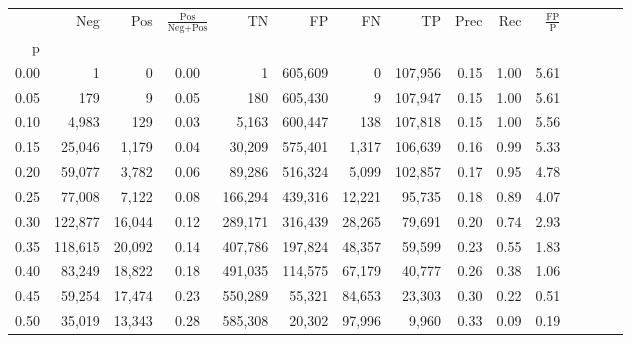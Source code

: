 \begin{tabular}{rrrcrrrrrrrrrrr}
\toprule
{} &      Neg &     Pos & $\frac{\text{Pos}}{\text{Neg}+\text{Pos}}$ &       TN &       FP &       FN &       TP &  Prec &   Rec & $\frac{\text{FP}}{\text{P}}$ \\
p    &          &         &                                            &          &          &          &          &       &       &                              \\
\midrule
0.00 &        1 &       0 &                                       0.00 &        1 &  605,609 &        0 &  107,956 &  0.15 &  1.00 &                         5.61 \\
0.05 &      179 &       9 &                                       0.05 &      180 &  605,430 &        9 &  107,947 &  0.15 &  1.00 &                         5.61 \\
0.10 &    4,983 &     129 &                                       0.03 &    5,163 &  600,447 &      138 &  107,818 &  0.15 &  1.00 &                         5.56 \\
0.15 &   25,046 &   1,179 &                                       0.04 &   30,209 &  575,401 &    1,317 &  106,639 &  0.16 &  0.99 &                         5.33 \\
0.20 &   59,077 &   3,782 &                                       0.06 &   89,286 &  516,324 &    5,099 &  102,857 &  0.17 &  0.95 &                         4.78 \\
0.25 &   77,008 &   7,122 &                                       0.08 &  166,294 &  439,316 &   12,221 &   95,735 &  0.18 &  0.89 &                         4.07 \\
0.30 &  122,877 &  16,044 &                                       0.12 &  289,171 &  316,439 &   28,265 &   79,691 &  0.20 &  0.74 &                         2.93 \\
0.35 &  118,615 &  20,092 &                                       0.14 &  407,786 &  197,824 &   48,357 &   59,599 &  0.23 &  0.55 &                         1.83 \\
0.40 &   83,249 &  18,822 &                                       0.18 &  491,035 &  114,575 &   67,179 &   40,777 &  0.26 &  0.38 &                         1.06 \\
0.45 &   59,254 &  17,474 &                                       0.23 &  550,289 &   55,321 &   84,653 &   23,303 &  0.30 &  0.22 &                         0.51 \\
0.50 &   35,019 &  13,343 &                                       0.28 &  585,308 &   20,302 &   97,996 &    9,960 &  0.33 &  0.09 &                         0.19 \\

\end{tabular}

